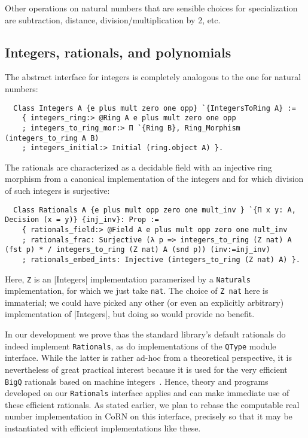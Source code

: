 \documentclass[a4paper,10pt,runningheads]{llncs}
\begin{document}
Other operations on natural numbers that are sensible choices for specialization are subtraction, distance, division/multiplication by 2, etc.

\subsection{Integers, rationals, and polynomials}

The abstract interface for integers is completely analogous to the one for natural numbers:
\begin{lstlisting}
  Class Integers A {e plus mult zero one opp} `{IntegersToRing A} :=
    { integers_ring:> @Ring A e plus mult zero one opp
    ; integers_to_ring_mor:> Π `{Ring B}, Ring_Morphism (integers_to_ring A B)
    ; integers_initial:> Initial (ring.object A) }.
\end{lstlisting}

The rationals are characterized as a decidable field with an injective ring morphism from a canonical implementation of the integers and for which division of such integers is surjective:
\begin{lstlisting}
  Class Rationals A {e plus mult opp zero one mult_inv } `{Π x y: A, Decision (x = y)} {inj_inv}: Prop :=
    { rationals_field:> @Field A e plus mult opp zero one mult_inv
    ; rationals_frac: Surjective (λ p => integers_to_ring (Z nat) A (fst p) * / integers_to_ring (Z nat) A (snd p)) (inv:=inj_inv)
    ; rationals_embed_ints: Injective (integers_to_ring (Z nat) A) }.
\end{lstlisting}
Here, \lstinline|Z| is an \lstinling|Integers| implementation paramerized by a \lstinline|Naturals| implementation, for which we just take \lstinline|nat|. The choice of \lstinline|Z nat| here is immaterial; we could have picked any other (or even an explicitly arbitrary) implementation of \lstinilne|Integers|, but doing so would provide no benefit.

In our development we prove thas the standard library's default rationals do indeed implement \lstinline|Rationals|, as do implementations of the \lstinline|QType| module interface. While the latter is rather ad-hoc from a theoretical perspective, it is nevertheless of great practical interest because it is used for the very efficient \lstinline|BigQ| rationals based on machine integers~\cite{something}. Hence, theory and programs developed on our \lstinline|Rationals| interface applies and can make immediate use of these efficient rationals. As stated earlier, we plan to rebase the computable real number implementation in CoRN on this interface, precisely so that it may be instantiated with efficient implementations like these.
\end{document}
